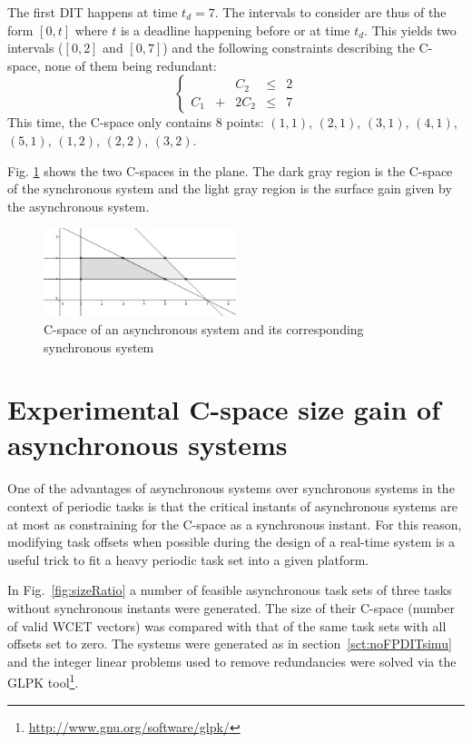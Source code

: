 \documentclass[conference]{IEEEtran}
\begin{document}
The first DIT happens at time $t_d = 7$. The intervals to consider are thus of the form $[0, t]$ where $t$ is a deadline happening before or at time $t_d$. This yields two intervals ($[0, 2]$ and $[0, 7]$) and the following constraints describing the C-space, none of them being redundant:
$$
\left\{
  \begin{array}{ccccc}
    & & C_2 & \leqslant & 2 \\
    C_1 & + & 2 C_2 & \leqslant & 7
  \end{array}
\right.
$$
This time, the C-space only contains 8 points: $(1, 1)$, $(2, 1)$, $(3, 1)$, $(4, 1)$, $(5, 1)$, $(1, 2)$, $(2, 2)$, $(3, 2)$.

Fig. \ref{fig:cspaceComp} shows the two C-spaces in the plane. The dark gray region is the C-space of the synchronous system and the light gray region is the surface gain given by the asynchronous system.

\begin{figure}[h]
\begin{center}
  \includegraphics[width=0.5\textwidth]{figs/cspace_example.png}
  \caption{C-space of an asynchronous system and its corresponding synchronous system}
  \label{fig:cspaceComp}
\end{center}
\end{figure}


\section{Experimental C-space size gain of asynchronous systems}
\label{sct:expCspaceGain}
	One of the advantages of asynchronous systems over synchronous systems in the
	context of periodic tasks is that the critical instants of asynchronous systems
	are at most as constraining for the C-space as a synchronous instant. For this
	reason, modifying task offsets when possible during
	the design of a real-time system is a useful trick to fit a heavy periodic task set
	into a given platform.

	In Fig.~\ref{fig:sizeRatio} a number of feasible asynchronous task sets of
	three tasks without synchronous instants were generated. The size of their
	C-space (number of valid WCET vectors) was compared with that of the same
	task sets with all offsets set to zero. The systems were generated as in section~\ref{sct:noFPDITsimu}
	and the integer linear problems used to remove redundancies were solved via the GLPK tool\footnote{\url{http://www.gnu.org/software/glpk/}}.
\end{document}
